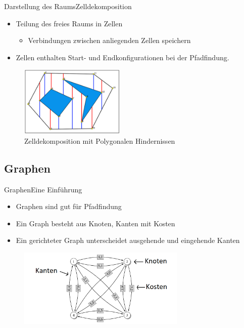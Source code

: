 \documentclass[t,aspectratio=169,dvipsnames]{beamer}
\begin{document}
\begin{frame}{Darstellung des Raums}{Zelldekomposition}

	\begin{itemize}
		\item Teilung des freies Raums in Zellen
		\begin{itemize}
			\item Verbindungen zwischen anliegenden Zellen speichern
		\end{itemize}
	    \item Zellen enthalten Start- und Endkonfigurationen bei der Pfadfindung.
	\end{itemize}
	
	\begin{figure}
		\includegraphics[width=5.0cm]{images/Bild4.png}
		\caption{Zelldekomposition mit Polygonalen Hindernissen} 

	\end{figure}
\end{frame}

\subsection{Graphen}

\begin{frame}{Graphen}{Eine Einführung}
	\begin{itemize}
		\item Graphen sind gut für Pfadfindung
		\item Ein Graph besteht aus Knoten, Kanten mit Kosten
		\item Ein gerichteter Graph unterscheidet ausgehende und eingehende Kanten
	\end{itemize}
	
	\begin{figure}
		\includegraphics[width=8.0cm]{images/kk_graph_S6.png}

	\end{figure}
\end{frame}
\end{document}
